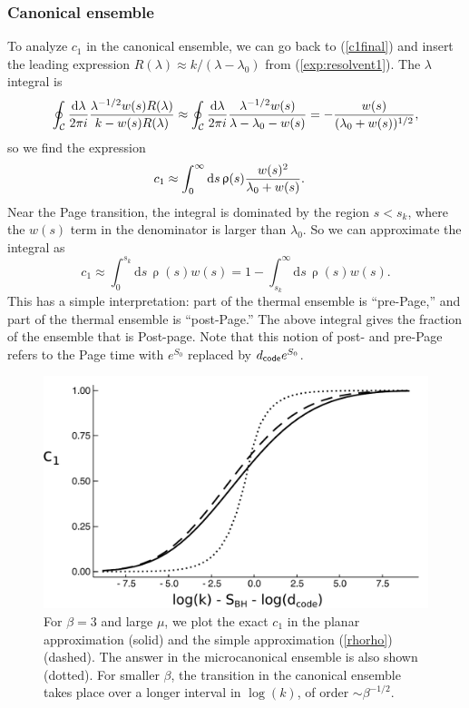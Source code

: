 \documentclass[12pt]{article}
\newcommand{\be}{\begin{equation}}
\newcommand{\ee}{\end{equation}}
\numberwithin{equation}{section}
\begin{document}
\subsubsection{Canonical ensemble}
To analyze $c_1$ in the canonical ensemble, we can go back to (\ref{c1final}) and insert the leading expression $R(\lambda) \approx k/(\lambda-\lambda_0)$ from (\ref{exp:resolvent1}). The $\lambda$ integral is
\be
\oint_{\mathcal{C}} \frac{\mathrm{d}\lambda}{2\pi i} {\lambda^{-1/2}w(s)R(\lambda)\over k -w(s)R(\lambda)}\approx \oint_{\mathcal{C}} \frac{\mathrm{d}\lambda}{2\pi i}\frac{\lambda^{-1/2}w(s)}{\lambda - \lambda_0 - w(s)}=-\frac{w(s)}{(\lambda_0 + w(s))^{1/2}},\label{LHScorr}
\ee
so we find the expression
\begin{align}
c_1&\approx \int_{0}^{\infty}\mathrm{d}s\,\uprho(s){w(s)^2\over \lambda_{0}+w(s)}\label{rhorho}.%
\end{align}
Near the Page transition, the integral is dominated by the region $s < s_k$, where the $w(s)$ term in the denominator is larger than $\lambda_0$. So we can approximate the integral as 
\be
c_1 \approx \int_0^{s_k} \mathrm{d}s\,\uprho(s) w(s) = 1 - \int_{s_k}^\infty \mathrm{d}s\,\uprho(s)w(s).\label{corrone}
\ee
This has a simple interpretation: part of the thermal ensemble is ``pre-Page,'' and part of the thermal ensemble is ``post-Page.'' The above integral gives the fraction of the ensemble that is Post-page. Note that this notion of post- and pre-Page refers to the Page time with $e^{S_0}$ replaced by $d_{\sf{code}}e^{S_0}$.

\begin{figure}[t]
\begin{center}
\includegraphics[width = .45\textwidth]{images/petz2.pdf}
\caption{{\small For $\beta = 3$ and large $\mu$, we plot the exact $c_1$ in the planar approximation (solid) and the simple approximation (\ref{rhorho}) (dashed). The answer in the microcanonical ensemble is also shown (dotted). For smaller $\beta$, the transition in the canonical ensemble takes place over a longer interval in $\log(k)$, of order $\sim\beta^{-1/2}$.}}\label{fig:petzerror}
\end{center}
\end{figure}
\end{document}
